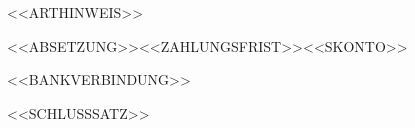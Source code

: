 \documentclass[10pt,a4paper]{article}
\newcommand{\hinweisabsatz}[1]{\par\vspace{5mm}\noindent%
  {\interlinepenalty=10000 \nonfrenchspacing\sfcode`\:=1000 \sfcode`\;=1000 \sfcode`\,=1000 #1\par}}
\begin{document}
<<ARTHINWEIS>>


<<ABSETZUNG>><<ZAHLUNGSFRIST>><<SKONTO>>

<<BANKVERBINDUNG>>

\nopagebreak
\vspace{8mm}

{ <<SCHLUSSSATZ>>\par}
\end{document}
